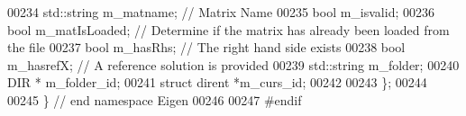 \begin{DoxyCode}
00234     std::string m\_matname; \textcolor{comment}{// Matrix Name}
00235     \textcolor{keywordtype}{bool} m\_isvalid; 
00236     \textcolor{keywordtype}{bool} m\_matIsLoaded; \textcolor{comment}{// Determine if the matrix has already been loaded from the file}
00237     \textcolor{keywordtype}{bool} m\_hasRhs; \textcolor{comment}{// The right hand side exists}
00238     \textcolor{keywordtype}{bool} m\_hasrefX; \textcolor{comment}{// A reference solution is provided}
00239     std::string m\_folder;
00240     DIR * m\_folder\_id;
00241     \textcolor{keyword}{struct }dirent *m\_curs\_id; 
00242     
00243 \};
00244 
00245 \} \textcolor{comment}{// end namespace Eigen}
00246 
00247 \textcolor{preprocessor}{#endif}
\end{DoxyCode}

